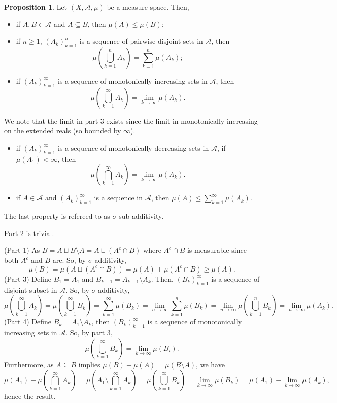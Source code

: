 \documentclass[
]{article}
\theoremstyle{definition}
\newtheorem{prop}{Proposition}
\theoremstyle{definition}
\begin{document}
\begin{prop}
  Let \((X, \mathcal{A}, \mu)\) be a measure space. Then, 
  \begin{itemize}
    \item if \(A, B \in \mathcal{A}\) and \(A \subseteq B\), then \(\mu(A) \le \mu(B)\);
    \item if \(n \ge 1\), \((A_k)_{k = 1}^n\) is a sequence of pairwise disjoint sets 
      in \(\mathcal{A}\), then \[\mu\left(\bigcup_{k = 1}^n A_k\right) = 
        \sum_{k = 1}^n \mu (A_k);\]
    \item if \((A_k)_{k = 1}^\infty\) is a sequence of monotonically increasing 
      sets in \(\mathcal{A}\), then 
        \[\mu\left(\bigcup_{k = 1}^\infty A_k\right) = \lim_{k \to \infty}\mu(A_k).\]
  \end{itemize}
  We note that the limit in part 3 exists since the limit in monotonically increasing 
  on the extended reals (so bounded by \(\infty\)). 
  \begin{itemize}
    \item if \((A_k)_{k = 1}^\infty\) is a sequence of monotonically decreasing 
      sets in \(\mathcal{A}\), if \(\mu(A_1) < \infty\), then
      \[\mu\left(\bigcap_{k = 1}^\infty A_k\right) = \lim_{k \to \infty}\mu(A_k).\]
    \item if \(A \in \mathcal{A}\) and \((A_k)_{k = 1}^\infty\) is a sequence in 
      \(\mathcal{A}\), then \(\mu(A) \le \sum_{k = 1}^\infty \mu(A_k)\).
  \end{itemize}
  The last property is refereed to as \(\sigma\)-sub-additivity.
\end{prop}
\proof

Part 2 is trivial.

(Part 1) As \(B = A \sqcup B \setminus A = A \sqcup (A^c \cap B)\) where
\(A^c \cap B\) is measurable since both \(A^c\) and \(B\) are. So, by
\(\sigma\)-additivity,
\[\mu(B) = \mu(A \sqcup (A^c \cap B)) = \mu(A) + \mu(A^c \cap B) \ge \mu(A).\]
(Part 3) Define \(B_1 = A_1\) and
\(B_{k + 1} = A_{k + 1} \setminus A_k\). Then, \((B_k)_{k = 1}^\infty\)
is a sequence of disjoint subset in \(\mathcal{A}\). So, by
\(\sigma\)-additivity, \[\mu\left(\bigcup_{k = 1}^\infty A_k\right) = 
    \mu\left(\bigcup_{k = 1}^\infty B_k\right) = 
    \sum_{k = 1}^\infty \mu(B_k) = \lim_{n \to \infty} \sum_{k = 1}^n \mu(B_k)
    = \lim_{n \to \infty} \mu\left(\bigcup_{k = 1}^n B_k\right)= \lim_{n \to \infty} \mu(A_k). \]
(Part 4) Define \(B_k = A_1 \setminus A_k\), then
\((B_k)_{k = 1}^\infty\) is a sequence of monotonically increasing sets
in \(\mathcal{A}\). So, by part 3,
\[\mu\left(\bigcup_{k = 1}^\infty B_k \right) = \lim_{k \to \infty} \mu(B_l).\]
Furthermore, as \(A \subseteq B\) implies
\(\mu (B) - \mu(A) = \mu(B \setminus A)\), we have
\[\mu(A_1) - \mu \left(\bigcap_{k = 1}^\infty A_k\right) = 
    \mu\left(A_1 \setminus \bigcap_{k = 1}^\infty A_k\right) = 
    \mu\left(\bigcup_{k = 1}^\infty B_k \right) = \lim_{k \to \infty} \mu(B_k)
    = \mu(A_1) - \lim_{k \to \infty} \mu(A_k),\] hence the result.
\end{document}
